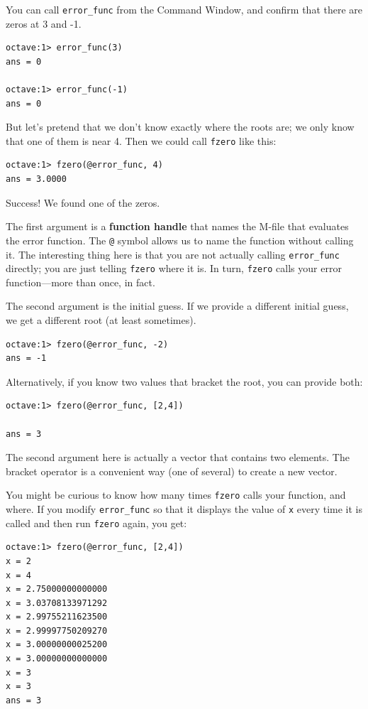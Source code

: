 \documentclass{book}
\begin{document}
You can call {\tt error\_func} from the Command Window, and
confirm that there are zeros at 3 and -1.

\begin{verbatim}
octave:1> error_func(3)
ans = 0

octave:1> error_func(-1)
ans = 0
\end{verbatim}

But let's pretend that we don't know exactly where
the roots are; we only know that one of them is near 4. Then
we could call {\tt fzero} like this:

\begin{verbatim}
octave:1> fzero(@error_func, 4)
ans = 3.0000
\end{verbatim}

Success! We found one of the zeros.

The first argument is a
{\bf function handle} that names the M-file that evaluates
the error function. The {\tt @} symbol allows us to name the
function without calling it. The interesting thing here is
that you are not actually calling {\tt error\_func} directly;
you are just telling {\tt fzero} where it is. In turn, {\tt fzero}
calls your error function---more than once, in fact.

The second argument is the initial guess. If we provide a different
initial guess, we get a different root (at least sometimes).

\begin{verbatim}
octave:1> fzero(@error_func, -2)
ans = -1
\end{verbatim}

Alternatively, if you know two values that bracket the root,
you can provide both:

\begin{verbatim}
octave:1> fzero(@error_func, [2,4])

ans = 3
\end{verbatim}

The second argument here is actually a vector that contains two
elements. The bracket operator is a convenient way (one of several)
to create a new vector.

You might be curious to know how many times {\tt fzero} calls your
function, and where. If you modify {\tt error\_func} so that it displays
the value of {\tt x} every time it is called and then run {\tt fzero}
again, you get:

\begin{verbatim}
octave:1> fzero(@error_func, [2,4])
x = 2
x = 4
x = 2.75000000000000
x = 3.03708133971292
x = 2.99755211623500
x = 2.99997750209270
x = 3.00000000025200
x = 3.00000000000000
x = 3
x = 3
ans = 3
\end{verbatim}
\end{document}
